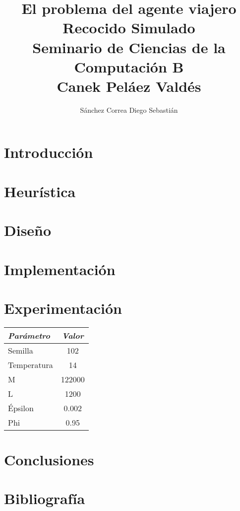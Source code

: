 \documentclass[a4paper]{article}
\title {\textbf {\Large{El problema del agente viajero}}\protect\\
  \large{\textbf{Recocido Simulado}}\protect\\ \vspace{0.4cm}
  \normalsize{\textbf{Seminario de Ciencias de la Computaci\'on B}} \protect\\ \vspace{0.2cm}
  \normalsize{Canek Pel\'aez Vald\'es}}
\date{}
\author{\normalsize Sánchez Correa Diego Sebastián}
\begin{document}
\allowdisplaybreaks
\maketitle

\section{Introducci\'on}

\section{Heur\'istica}
\section{Dise\~no}
\section{Implementaci\'on}
\section{Experimentaci\'on}

\begin{table}[h!]
  \begin{center}
    \begin{tabular}{||l|c||}
      \hline
      \textit{Par\'ametro} & \textit{Valor}\\
      \hline
      Semilla & 102 \\
      Temperatura & 14 \\
      M & 122000 \\
      L & 1200 \\
      \'Epsilon & 0.002 \\
      Phi & 0.95 \\
      \hline
    \end{tabular}
  \end{center}
\end{table}


\begin{figure}[h!tbp]
  \hspace*{-1.6cm}
  
\end{figure}


\begin{figure}[h!tbp]
  \hspace*{-1.6cm}
  
\end{figure}

\section{Conclusiones}

\section{Bibliograf\'ia}
\end{document}
